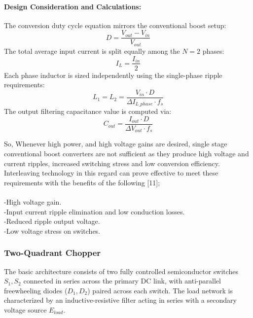 \paragraph{Design Consideration and Calculations:}
The conversion duty cycle equation mirrors the conventional boost setup:
\begin{equation}
    D = \frac{V_{out} - V_{in}}{V_{out}}
\end{equation}
The total average input current is split equally among the $N=2$ phases:
\begin{equation}
    I_L = \frac{I_{in}}{2}
\end{equation}
Each phase inductor is sized independently using the single-phase ripple requirements:
\begin{equation}
    L_1 = L_2 = \frac{V_{in} \cdot D}{\Delta I_{L\_phase} \cdot f_s}
\end{equation}
The output filtering capacitance value is computed via:
\begin{equation}
    C_{out} = \frac{I_{out} \cdot D}{\Delta V_{out} \cdot f_s}
\end{equation}

So, Whenever high power, and high voltage gains are desired, single stage conventional boost converters are not sufficient as they produce high voltage and current ripples, increased switching stress and low conversion efficiency.
Interleaving technology in this regard can prove effective to meet these requirements with the benefits of the following [11];
\\
\\
-High voltage gain.
\\
-Input current ripple elimination and low conduction losses.
\\
-Reduced ripple output voltage.
\\
-Low voltage stress on switches.

\subsubsection{Two-Quadrant Chopper}
The basic architecture consists of two fully controlled semiconductor switches $S_1, S_2$ connected in series across the primary DC link, with anti-parallel freewheeling diodes ($D_1, D_2$) paired across each switch. The load network is characterized by an inductive-resistive filter acting in series with a secondary voltage source $E_{load}$.

